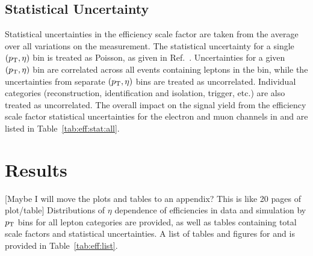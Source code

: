 \subsection{Statistical Uncertainty}
Statistical uncertainties in the efficiency scale factor are taken from the average over all variations on the measurement. The statistical uncertainty for a single $(p_{\mathrm{T}},\eta)$ bin is treated as Poisson, as given in Ref.~\cite{Paterno:2004cb}. Uncertainties for a given $(p_{\mathrm{T}},\eta)$ bin are correlated across all events containing leptons in the bin, while the uncertainties from separate $(p_{\mathrm{T}},\eta)$ bins are treated as uncorrelated. Individual categories (reconstruction, identification and isolation, trigger, etc.) are also treated as uncorrelated. The overall impact on the signal yield from the efficiency scale factor statistical uncertainties for the electron and muon channels in \sg and \sh are listed in Table~\ref{tab:eff:stat:all}.


% 
% 
% 
% 
% 
% 



\section{Results}\label{ch:eff:results}
[Maybe I will move the plots and tables to an appendix? This is like 20 pages of plot/table] Distributions of $\eta$ dependence of efficiencies in data and simulation by $p_{\mathrm{T}}$ bins for all lepton categories are provided, as well as tables containing total scale factors and statistical uncertainties. A list of tables and figures for \sg and \sh is provided in Table~\ref{tab:eff:list}.






